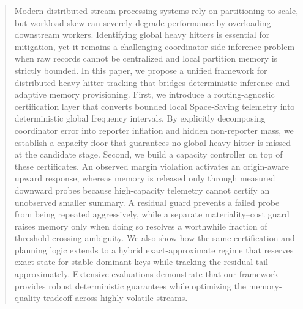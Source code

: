 \documentclass[sigconf, nonacm]{acmart}
\begin{document}
\begin{abstract}
Modern distributed stream processing systems rely on partitioning to scale, but workload skew can severely degrade performance by overloading downstream workers. Identifying global heavy hitters is essential for mitigation, yet it remains a challenging coordinator-side inference problem when raw records cannot be centralized and local partition memory is strictly bounded. In this paper, we propose a unified framework for distributed heavy-hitter tracking that bridges deterministic inference and adaptive memory provisioning. First, we introduce a routing-agnostic certification layer that converts bounded local Space-Saving telemetry into deterministic global frequency intervals. By explicitly decomposing coordinator error into reporter inflation and hidden non-reporter mass, we establish a capacity floor that guarantees no global heavy hitter is missed at the candidate stage. Second, we build a capacity controller on top of these certificates. An observed margin violation activates an origin-aware upward response, whereas memory is released only through measured downward probes because high-capacity telemetry cannot certify an unobserved smaller summary. A residual guard prevents a failed probe from being repeated aggressively, while a separate materiality--cost guard raises memory only when doing so resolves a worthwhile fraction of threshold-crossing ambiguity. We also show how the same certification and planning logic extends to a hybrid exact-approximate regime that reserves exact state for stable dominant keys while tracking the residual tail approximately. Extensive evaluations demonstrate that our framework provides robust deterministic guarantees while optimizing the memory-quality tradeoff across highly volatile streams.
\end{abstract}

\maketitle
\end{document}
